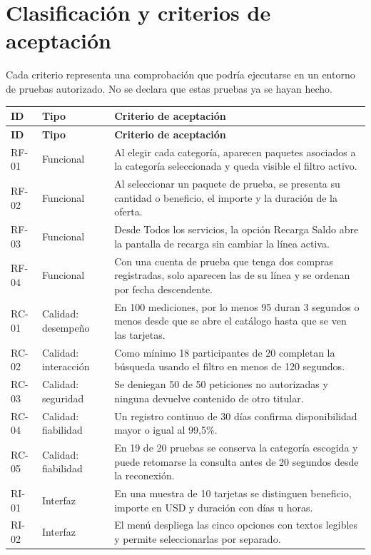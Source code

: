 \documentclass[12pt,a4paper]{article}
\begin{document}
\section{Clasificación y criterios de aceptación}
Cada criterio representa una comprobación que podría ejecutarse en un entorno de pruebas autorizado. No se declara que estas pruebas ya se hayan hecho.
\small
\begin{longtable}{@{}P{1.30cm}P{3.35cm}P{9.05cm}@{}}
\toprule
\textbf{ID} & \textbf{Tipo} & \textbf{Criterio de aceptación}\\\midrule
\endfirsthead
\toprule\textbf{ID} & \textbf{Tipo} & \textbf{Criterio de aceptación}\\\midrule
\endhead
RF-01 & Funcional & Al elegir cada categoría, aparecen paquetes asociados a la categoría seleccionada y queda visible el filtro activo.\\
RF-02 & Funcional & Al seleccionar un paquete de prueba, se presenta su cantidad o beneficio, el importe y la duración de la oferta.\\
RF-03 & Funcional & Desde Todos los servicios, la opción Recarga Saldo abre la pantalla de recarga sin cambiar la línea activa.\\
RF-04 & Funcional & Con una cuenta de prueba que tenga dos compras registradas, solo aparecen las de su línea y se ordenan por fecha descendente.\\
RC-01 & Calidad: desempeño & En 100 mediciones, por lo menos 95 duran 3 segundos o menos desde que se abre el catálogo hasta que se ven las tarjetas.\\
RC-02 & Calidad: interacción & Como mínimo 18 participantes de 20 completan la búsqueda usando el filtro en menos de 120 segundos.\\
RC-03 & Calidad: seguridad & Se deniegan 50 de 50 peticiones no autorizadas y ninguna devuelve contenido de otro titular.\\
RC-04 & Calidad: fiabilidad & Un registro continuo de 30 días confirma disponibilidad mayor o igual al 99,5\%.\\
RC-05 & Calidad: fiabilidad & En 19 de 20 pruebas se conserva la categoría escogida y puede retomarse la consulta antes de 20 segundos desde la reconexión.\\
RI-01 & Interfaz & En una muestra de 10 tarjetas se distinguen beneficio, importe en USD y duración con días u horas.\\
RI-02 & Interfaz & El menú despliega las cinco opciones con textos legibles y permite seleccionarlas por separado.\\

\end{longtable}
\end{document}
